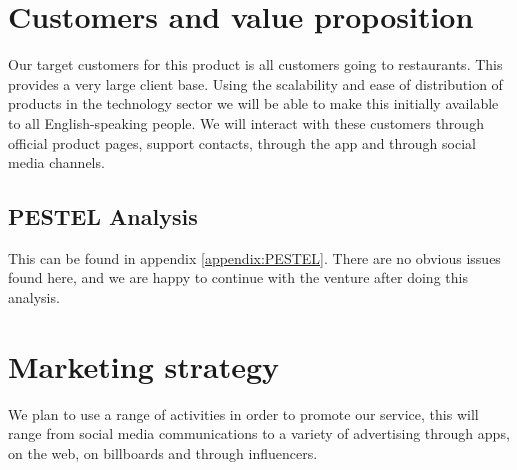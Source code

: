 \documentclass{article}[18pt]
\begin{document}
\section{Customers and value proposition}
Our target customers for this product is all customers going to restaurants. This provides a very large client base. Using the scalability and ease of distribution of products in the technology sector we will be able to make this initially available to all English-speaking people. We will interact with these customers through official product pages, support contacts, through the app and through social media channels.


\subsection{PESTEL Analysis}
This can be found in appendix \ref{appendix:PESTEL}. There are no obvious issues found here, and we are happy to continue with the venture after doing this analysis.
\section{Marketing strategy}
We plan to use a range of activities in order to promote our service, this will range from social media communications to a variety of advertising through apps, on the web, on billboards and through influencers.\\
\\
\end{document}
